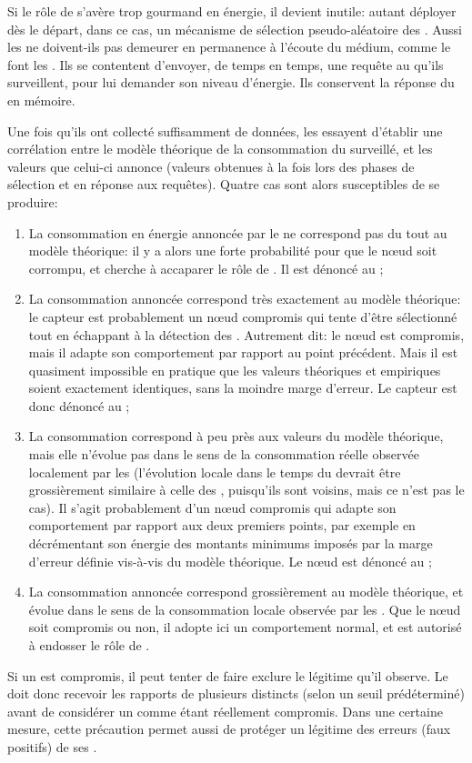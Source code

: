 Si le rôle de \vn s'avère trop gourmand en énergie, il devient inutile: autant déployer dès le départ, dans ce cas, un mécanisme de sélection pseudo-aléatoire des \cns.
Aussi les \vns ne doivent-ils pas demeurer en permanence à l'écoute du médium, comme le font les \cns.
Ils se contentent d'envoyer, de temps en temps, une requête au \cn qu'ils surveillent, pour lui demander son niveau d'énergie.
Ils conservent la réponse du \cn en mémoire.

Une fois qu'ils ont collecté suffisamment de données, les \vns essayent d'établir une corrélation entre le modèle théorique de la consommation du \cn surveillé, et les valeurs que celui-ci annonce (valeurs obtenues à la fois lors des phases de sélection et en réponse aux requêtes).
Quatre cas sont alors susceptibles de se produire:
\begin{enumerate}
    \item La consommation en énergie annoncée par le \cn ne correspond pas du tout au modèle théorique: il y a alors une forte probabilité pour que le nœud soit corrompu, et cherche à accaparer le rôle de \cn. Il est dénoncé au \ch;
    \item La consommation annoncée correspond très exactement au modèle théorique: le capteur est probablement un nœud compromis qui tente d'être sélectionné tout en échappant à la détection des \vns. Autrement dit: le nœud est compromis, mais il adapte son comportement par rapport au point précédent. Mais il est quasiment impossible en pratique que les valeurs théoriques et empiriques soient exactement identiques, sans la moindre marge d'erreur. Le capteur est donc dénoncé au \ch;
    \item La consommation correspond à peu près aux valeurs du modèle théorique, mais elle n'évolue pas dans le sens de la consommation réelle observée localement par les \vns (l'évolution locale dans le temps du \cn devrait être grossièrement similaire à celle des \vns, puisqu'ils sont voisins, mais ce n'est pas le cas). Il s'agit probablement d'un nœud compromis qui adapte son comportement par rapport aux deux premiers points, par exemple en décrémentant son énergie des montants minimums imposés par la marge d'erreur définie vis-à-vis du modèle théorique. Le nœud est dénoncé au \ch;
    \item La consommation annoncée correspond grossièrement au modèle théorique, et évolue dans le sens de la consommation locale observée par les \vns. Que le nœud soit compromis ou non, il adopte ici un comportement normal, et est autorisé à endosser le rôle de \cn.
\end{enumerate}
Si un \vn est compromis, il peut tenter de faire exclure le \cn légitime qu'il observe.
Le \ch doit donc recevoir les rapports de plusieurs \vns distincts (selon un seuil prédéterminé) avant de considérer un \cn comme étant réellement compromis.
Dans une certaine mesure, cette précaution permet aussi de protéger un \cn légitime des erreurs (faux positifs) de ses \vns.

